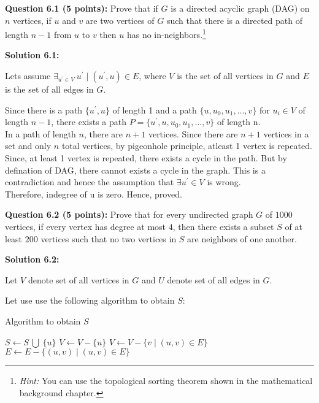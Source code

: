 \documentclass[11pt]{article}
\begin{document}
\textbf{Question 6.1 (5 points):} Prove that if \(G\) is a directed
acyclic graph (DAG) on \(n\) vertices, if \(u\) and \(v\) are two
vertices of \(G\) such that there is a directed path of length \(n-1\)
from \(u\) to \(v\) then \(u\) has no in-neighbors.\footnote{\emph{Hint:}
You can use the topological sorting theorem shown in the mathematical
background chapter.}

\textbf{Solution 6.1:}

Lets assume $\exists_{u^{\prime} \in V}\ u^{\prime} \mid
(u^{\prime}, u) \in E$, where $V$ is the set of all vertices in $G$ 
and $E$ is the set of all edges in $G$.

Since there is a path $\{u^{\prime}, u\}$ of length 1 and a path 
$\{u, u_0, u_1, \dots, v\}$ for $u_i \in V$ of length $n - 1$, there exists
a path $P = \{u^{\prime}, u, u_0, u_1, \dots, v\}$ of length n.\\

In a path of length $n$, there are $n + 1$ vertices. Since there are $n + 1$
vertices in a set and only $n$ total vertices, by pigeonhole principle, atleast
1 vertex is repeated.\\

Since, at least 1 vertex is repeated, there exists a cycle in the path. But by
defination of DAG, there cannot exists a cycle in the graph. This is a
contradiction and hence the assumption that $\exists u^{\prime} \in V$
is wrong.\\

Therefore, indegree of u is zero. Hence, proved.

\textbf{Question 6.2 (5 points):} Prove that for every undirected graph
\(G\) of \(1000\) vertices, if every vertex has degree at most \(4\),
then there exists a subset \(S\) of at least \(200\) vertices such that
no two vertices in \(S\) are neighbors of one another.

\textbf{Solution 6.2:}

Let $V$ denote set of all vertices in $G$ and $U$ denote set of all edges
in $G$.

Let use use the following algorithm to obtain $S$:

\begin{algorithm}
    \caption{Algorithm to obtain $S$}
    \label{calcS}
    \begin{algorithmic}
        \STATE $S \leftarrow S\ \bigcup\ \{u\}$
        \STATE $V \leftarrow V - \{u\}$
        \STATE $V \leftarrow V - \{v \mid (u, v) \in E\}$
        \STATE $E \leftarrow E - \{(u, v) \mid (u, v) \in E\}$
        \ENDWHILE
    \end{algorithmic}
\end{algorithm}
\end{document}
